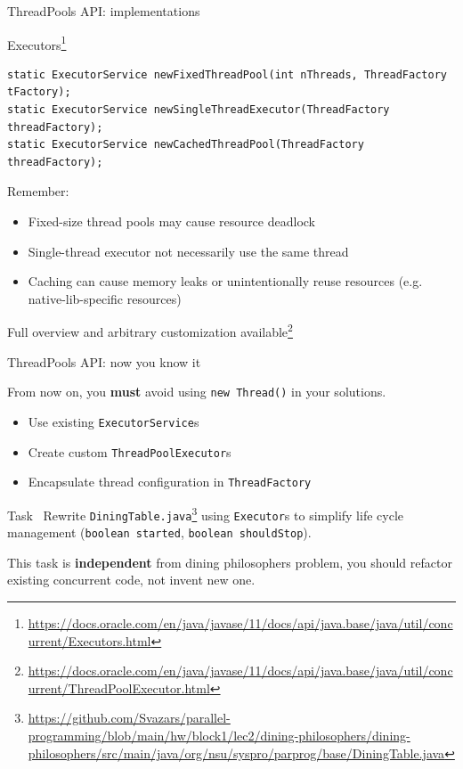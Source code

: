 \begin{frame}[fragile]{ThreadPools API: implementations}

Executors\footnote{\tiny\url{https://docs.oracle.com/en/java/javase/11/docs/api/java.base/java/util/concurrent/Executors.html}}

\begin{verbatim}
static ExecutorService newFixedThreadPool(int nThreads, ThreadFactory tFactory);
static ExecutorService newSingleThreadExecutor(ThreadFactory threadFactory);
static ExecutorService newCachedThreadPool(ThreadFactory threadFactory);
\end{verbatim}

\pause

Remember:
\begin{itemize}
    \item Fixed-size thread pools may cause resource deadlock
    \item Single-thread executor not necessarily use the same thread
    \item Caching can cause memory leaks or unintentionally reuse resources (e.g. native-lib-specific resources)
\end{itemize}

Full overview and arbitrary customization available\footnote{\tiny\url{https://docs.oracle.com/en/java/javase/11/docs/api/java.base/java/util/concurrent/ThreadPoolExecutor.html}}

\end{frame}


\begin{frame}[fragile]{ThreadPools API: now you know it}

From now on, you \textbf{must} avoid using \texttt{new Thread()} in your solutions.

\begin{itemize}
    \item Use existing \texttt{ExecutorService}s
    \item Create custom \texttt{ThreadPoolExecutor}s
    \item Encapsulate thread configuration in \texttt{ThreadFactory}
\end{itemize}

\pause

\begin{homeworkcode}{Task~\taskRewritePhilosophers}
Rewrite \texttt{DiningTable.java}\footnote{\tiny\url{https://github.com/Svazars/parallel-programming/blob/main/hw/block1/lec2/dining-philosophers/dining-philosophers/src/main/java/org/nsu/syspro/parprog/base/DiningTable.java}} using \texttt{Executor}s to simplify life cycle management (\texttt{boolean started}, \texttt{boolean shouldStop}).
\end{homeworkcode}

This task is \textbf{independent} from dining philosophers problem, you should refactor existing concurrent code, not invent new one.

\end{frame}


